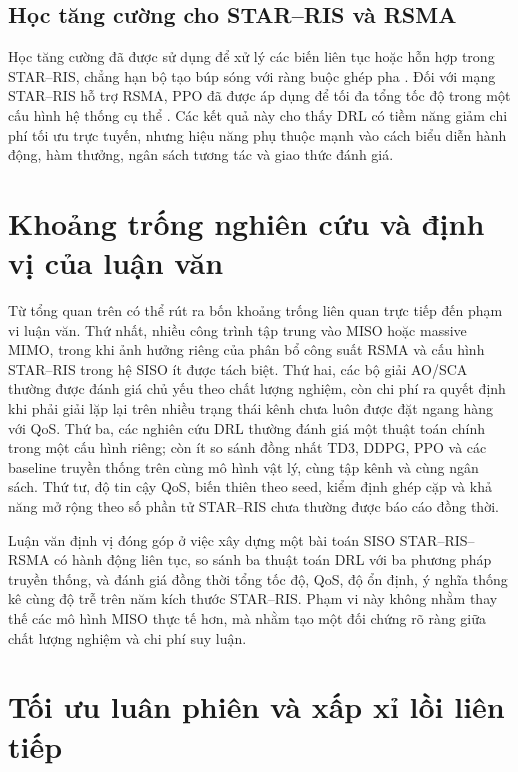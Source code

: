 \subsection{Học tăng cường cho STAR--RIS và RSMA}
Học tăng cường đã được sử dụng để xử lý các biến liên tục hoặc hỗn hợp trong STAR--RIS, chẳng hạn bộ tạo búp sóng với ràng buộc ghép pha \cite{Zhong2022HybridRLSTAR}. Đối với mạng STAR--RIS hỗ trợ RSMA, PPO đã được áp dụng để tối đa tổng tốc độ trong một cấu hình hệ thống cụ thể \cite{Meng2024PPOSTARRSMA}. Các kết quả này cho thấy DRL có tiềm năng giảm chi phí tối ưu trực tuyến, nhưng hiệu năng phụ thuộc mạnh vào cách biểu diễn hành động, hàm thưởng, ngân sách tương tác và giao thức đánh giá.

\section{Khoảng trống nghiên cứu và định vị của luận văn}
Từ tổng quan trên có thể rút ra bốn khoảng trống liên quan trực tiếp đến phạm vi luận văn. Thứ nhất, nhiều công trình tập trung vào MISO hoặc massive MIMO, trong khi ảnh hưởng riêng của phân bổ công suất RSMA và cấu hình STAR--RIS trong hệ SISO ít được tách biệt. Thứ hai, các bộ giải AO/SCA thường được đánh giá chủ yếu theo chất lượng nghiệm, còn chi phí ra quyết định khi phải giải lặp lại trên nhiều trạng thái kênh chưa luôn được đặt ngang hàng với QoS. Thứ ba, các nghiên cứu DRL thường đánh giá một thuật toán chính trong một cấu hình riêng; còn ít so sánh đồng nhất TD3, DDPG, PPO và các baseline truyền thống trên cùng mô hình vật lý, cùng tập kênh và cùng ngân sách. Thứ tư, độ tin cậy QoS, biến thiên theo seed, kiểm định ghép cặp và khả năng mở rộng theo số phần tử STAR--RIS chưa thường được báo cáo đồng thời.

Luận văn định vị đóng góp ở việc xây dựng một bài toán SISO STAR--RIS--RSMA có hành động liên tục, so sánh ba thuật toán DRL với ba phương pháp truyền thống, và đánh giá đồng thời tổng tốc độ, QoS, độ ổn định, ý nghĩa thống kê cùng độ trễ trên năm kích thước STAR--RIS. Phạm vi này không nhằm thay thế các mô hình MISO thực tế hơn, mà nhằm tạo một đối chứng rõ ràng giữa chất lượng nghiệm và chi phí suy luận.

\section{Tối ưu luân phiên và xấp xỉ lồi liên tiếp}

